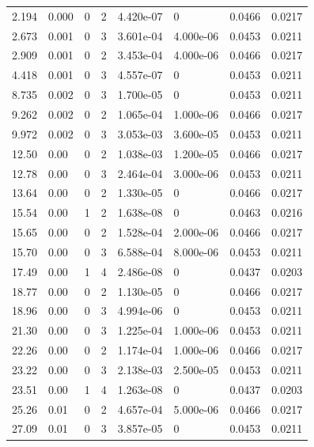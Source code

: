 \documentclass[preview]{standalone}
\begin{document}
{{\begin{tabular}{L{1.2cm}C{1.2cm} C{0.3cm}C{0.5cm} C{1.4cm}C{1.4cm} C{1.4cm}C{1.4cm}}
  2.194  &  0.000  & 0     &  2 &  4.420e-07  & 0  & 0.0466 &  0.0217   \\ 
  2.673  &  0.001  & 0     &  3 &  3.601e-04  & 4.000e-06  & 0.0453 &  0.0211   \\ 
  2.909  &  0.001  & 0     &  2 &  3.453e-04  & 4.000e-06  & 0.0466 &  0.0217   \\ 
  4.418  &  0.001  & 0     &  3 &  4.557e-07  & 0  & 0.0453 &  0.0211   \\ 
  8.735  &  0.002  & 0     &  3 &  1.700e-05  & 0  & 0.0453 &  0.0211   \\ 
  9.262  &  0.002  & 0     &  2 &  1.065e-04  & 1.000e-06  & 0.0466 &  0.0217   \\ 
  9.972  &  0.002  & 0     &  3 &  3.053e-03  & 3.600e-05  & 0.0453 &  0.0211   \\ 
  12.50  &  0.00  & 0     &  2 &  1.038e-03  & 1.200e-05  & 0.0466 &  0.0217   \\ 
  12.78  &  0.00  & 0     &  3 &  2.464e-04  & 3.000e-06  & 0.0453 &  0.0211   \\ 
  13.64  &  0.00  & 0     &  2 &  1.330e-05  & 0  & 0.0466 &  0.0217   \\ 
  15.54  &  0.00  & 1     &  2 &  1.638e-08  & 0  & 0.0463 &  0.0216   \\ 
  15.65  &  0.00  & 0     &  2 &  1.528e-04  & 2.000e-06  & 0.0466 &  0.0217   \\ 
  15.70  &  0.00  & 0     &  3 &  6.588e-04  & 8.000e-06  & 0.0453 &  0.0211   \\ 
  17.49  &  0.00  & 1     &  4 &  2.486e-08  & 0  & 0.0437 &  0.0203   \\ 
  18.77  &  0.00  & 0     &  2 &  1.130e-05  & 0  & 0.0466 &  0.0217   \\ 
  18.96  &  0.00  & 0     &  3 &  4.994e-06  & 0  & 0.0453 &  0.0211   \\ 
  21.30  &  0.00  & 0     &  3 &  1.225e-04  & 1.000e-06  & 0.0453 &  0.0211   \\ 
  22.26  &  0.00  & 0     &  2 &  1.174e-04  & 1.000e-06  & 0.0466 &  0.0217   \\ 
  23.22  &  0.00  & 0     &  3 &  2.138e-03  & 2.500e-05  & 0.0453 &  0.0211   \\ 
  23.51  &  0.00  & 1     &  4 &  1.263e-08  & 0  & 0.0437 &  0.0203   \\ 
  25.26  &  0.01  & 0     &  2 &  4.657e-04  & 5.000e-06  & 0.0466 &  0.0217   \\ 
  27.09  &  0.01  & 0     &  3 &  3.857e-05  & 0  & 0.0453 &  0.0211   \\ 

\end{tabular}}}
\end{document}
